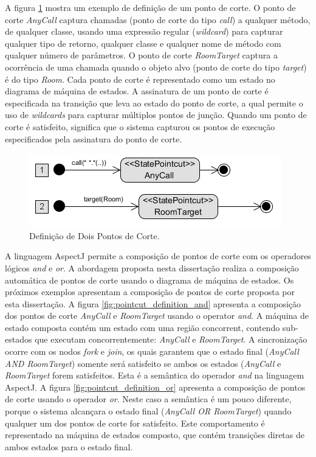 A figura \ref{fig:pointcut_definition_1} mostra um exemplo de definição de um ponto de corte. O ponto de corte \textit{AnyCall} captura chamadas
(ponto de corte do tipo \textit{call}) a qualquer método, de qualquer classe, usando uma expressão regular (\textit{wildcard}) para capturar qualquer
tipo de retorno, qualquer classe e qualquer nome de método com qualquer número de parâmetros. O ponto de corte \textit{RoomTarget} captura a ocorrência de uma chamada
quando o objeto alvo (ponto de corte do tipo \textit{target}) é do tipo \textit{Room}. Cada ponto de corte é representado como um estado no diagrama
de máquina de estados. A assinatura de um ponto de corte é especificada na transição que leva ao estado do ponto de corte, a qual permite o uso de
\textit{wildcards} para capturar múltiplos pontos de junção. Quando um ponto de corte é satisfeito, significa que o sistema capturou os pontos de execução 
especificados pela assinatura do ponto de corte.

\begin{figure}[h]
	\centering
	\includegraphics{img/pointcut_definition_1.png}
	\caption{Definição de Dois Pontos de Corte.}\label{fig:pointcut_definition_1}
\end{figure}

A linguagem AspectJ permite a composição de pontos de corte com os operadores lógicos \textit{and} e \textit{or}. A abordagem proposta nesta
dissertação realiza a composição automática de pontos de corte usando o diagrama de máquina de estados. Os próximos exemplos apresentam a composição
de pontos de corte proposta por esta dissertação. A figura \ref{fig:pointcut_definition_and} apresenta a composição dos pontos de corte
\textit{AnyCall} e \textit{RoomTarget} usando o operator \textit{and}. A máquina de estado composta contém um estado com uma região concorrent, contendo 
sub-estados que executam concorrentemente: \textit{AnyCall} e \textit{RoomTarget}. A sincronização ocorre com os nodos \textit{fork} e \textit{join}, 
os quais garantem que o estado final (\textit{AnyCall AND RoomTarget}) somente será satisfeito se ambos os estados (\textit{AnyCall} e \textit{RoomTarget} 
forem satisfeitos. Esta é a semântica do operador \textit{and} na linguagem AspectJ. A figura
\ref{fig:pointcut_definition_or} apresenta a composição de pontos de corte usando o operador \textit{or}. Neste caso a semântica é um pouco diferente,
porque o sistema alcançara o estado final (\textit{AnyCall OR RoomTarget}) quando qualquer um dos pontos de corte for satisfeito. Este comportamento é
representado na máquina de estados composto, que contém transições diretas de ambos estados para o estado final.

